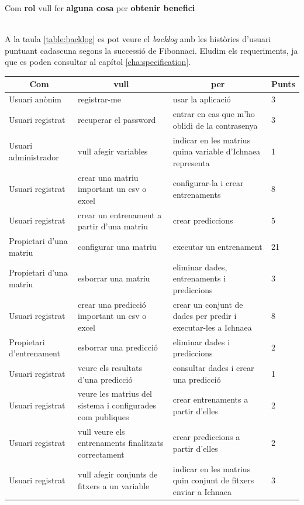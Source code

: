 \centerline{Com \textbf{rol} vull fer \textbf{alguna cosa} per \textbf{obtenir benefici}}
~\\
A la taula \ref{table:backlog} es pot veure el \textit{backlog} amb les hist\`{o}ries d'usuari puntuant cadascuna segons la successió de Fibonnaci.\cite{backlogfibonnacci} Eludim els requeriments, ja que es poden consultar al capítol \ref{cha:specification}.

\begin{center}
\begin{longtable}{ | p{3cm} | p{5cm} | p{5cm} | p{1cm} | }
\hline
\multicolumn{1}{|c|}{\textbf{Com}} & \multicolumn{1}{|c|}{\textbf{vull}} & \multicolumn{1}{|c|}{\textbf{per}} &\multicolumn{1}{|c|}{\textbf{Punts}} \\ \hline
Usuari anònim &	registrar-me &	usar la aplicació &	3 \\ \hline
Usuari registrat &	recuperar el password & entrar en cas que m'ho oblidi de la contrasenya & 3 \\ \hline
Usuari administrador &	vull afegir variables & indicar en les matrius quina variable d'Ichnaea representa & 1 \\ \hline
Usuari registrat &	crear una matriu important un csv o excel & configurar-la i crear entrenaments & 8 \\ \hline
Usuari registrat &	crear un entrenament a partir d'una matriu & crear prediccions & 5 \\ \hline
Propietari d'una matriu & configurar una matriu & executar un entrenament & 21 \\ \hline
Propietari d'una matriu	& esborrar una matriu & eliminar dades, entrenaments i prediccions & 3 \\ \hline
Usuari registrat &	crear una predicció important un csv o excel & crear un conjunt de dades per predir i executar-les a Ichnaea & 8 \\ \hline
Propietari d'entrenament & 	esborrar una predicció & eliminar dades i prediccions & 2 \\ \hline
Usuari registrat & veure els resultats d'una predicció & consultar dades i crear una predicció & 1 \\ \hline
Usuari registrat & veure les matrius del sistema i configurades com publiques & crear entrenaments a partir d'elles & 2  \\ \hline
Usuari registrat & vull veure els entrenaments finalitzats correctament	 & crear prediccions a partir d'elles & 2  \\ \hline
Usuari registrat & vull afegir conjunts de fitxers a un variable & indicar en les matrius quin conjunt de fitxers enviar a Ichnaea & 3  \\ \hline

\end{longtable}
\end{center}

